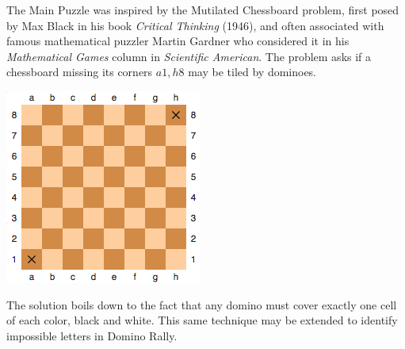 


  The Main Puzzle was inspired by the Mutilated Chessboard problem, first posed
  by Max Black in his book \textit{Critical Thinking} (1946), and often
  associated with famous mathematical puzzler Martin Gardner who considered
  it in his \textit{Mathematical Games} column in \textit{Scientific American}.
  The problem asks if a chessboard missing its corners \(a1,h8\)
  may be tiled by dominoes.

  \begin{center}
    \includegraphics[width=0.3\linewidth]{mutilated-chessboard.png}
  \end{center}

  The solution boils down to the fact that any domino must cover exactly one
  cell of each color, black and white. This same technique may be extended
  to identify impossible letters in Domino Rally.

